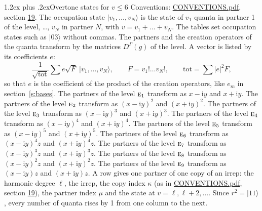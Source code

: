 \documentclass[10pt,a4paper]{article}
\makeatletter
\renewcommand\section{\@startsection{section}{1}{\z@}{-3ex plus -1ex minus -.2ex}%
  {1.2ex plus .2ex}{\normalfont\large\sffamily\bfseries\color{parttitle}}}
\numberwithin{equation}{section}
\newcommand{\irr}[1]{\text{\normalfont\scshape #1}}
\newcommand{\iunit}{\mathrm{i}}
\newcommand{\repD}[1]{D^{#1}}
\newcommand{\mult}{\kappa}
\newcommand{\intx}{\mu}
\newcommand{\occ}[1]{\lvert #1\rangle}
\makeatother
\begin{document}
\section{Overtone states for \texorpdfstring{$v \le 6$}{v \textleq\ 6}}\label{s:overtone_states}
Conventions: \href{../../CONVENTIONS.pdf}{CONVENTIONS.pdf}, section \href{../../CONVENTIONS.pdf\#conv.19}{19}.
\leavevmode\label{n:vector.occupation}\label{n:local.quanta.partner}\label{n:local.weight.occupation}The occupation state $\occ{v_1, \dots, v_N}$ is the state of $v_1$ quanta in partner 1 of the level, \dots, $v_N$ in partner $N$, with $v = v_1 + \dots + v_N$. The tables set occupation states such as $\occ{03}$ without commas. The partners and the creation operators of the quanta transform by the matrices $\repD{\Gamma}(g)$ of the level. A vector is listed by its coefficients $e$:
\begin{equation}\label{e:occupation}\frac{1}{\sqrt{\mathrm{tot}}}\sum e\sqrt{F}\;\occ{v_1, \dots, v_N},\qquad F = v_1!\dots v_N!,\qquad \mathrm{tot} = \sum |e|^2F,\end{equation}
so that $e$ is the coefficient of the product of the creation operators, like $e_m$ in section~\ref{s:bases}. The partners of the level $\irr{e}_{1}$ transform as $x - \iunit y$ and $x + \iunit y$. The partners of the level $\irr{e}_{2}$ transform as $(x - \iunit y)^{2}$ and $(x + \iunit y)^{2}$. The partners of the level $\irr{e}_{3}$ transform as $(x - \iunit y)^{3}$ and $(x + \iunit y)^{3}$. The partners of the level $\irr{e}_{4}$ transform as $(x - \iunit y)^{4}$ and $(x + \iunit y)^{4}$. The partners of the level $\irr{e}_{5}$ transform as $(x - \iunit y)^{5}$ and $(x + \iunit y)^{5}$. The partners of the level $\irr{e}_{6}$ transform as $(x - \iunit y)^{4} z$ and $(x + \iunit y)^{4} z$. The partners of the level $\irr{e}_{7}$ transform as $(x - \iunit y)^{3} z$ and $(x + \iunit y)^{3} z$. The partners of the level $\irr{e}_{8}$ transform as $(x - \iunit y)^{2} z$ and $(x + \iunit y)^{2} z$. The partners of the level $\irr{e}_{9}$ transform as $(x - \iunit y) z$ and $(x + \iunit y) z$. A row gives one partner of one copy of an irrep: the harmonic degree $\ell$, the irrep, the copy index $\mult$ (as in \href{../../CONVENTIONS.pdf}{CONVENTIONS.pdf}, section \href{../../CONVENTIONS.pdf\#conv.19}{19}), the partner index $\intx$ and the state at $v = \ell, \ell + 2, \dots$. Since $r^2 = \occ{11}$, every number of quanta rises by 1 from one column to the next.
\end{document}
